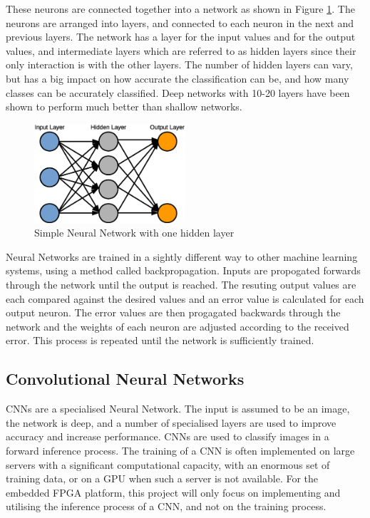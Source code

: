 \documentclass[12pt]{article}
\begin{document}
These neurons are connected together into a network as shown in Figure \ref{fig:ANN}. The neurons are arranged into layers, and connected to each neuron in the next and previous layers. The network has a layer for the input values and for the output values, and intermediate layers which are referred to as hidden layers since their only interaction is with the other layers. The number of hidden layers can vary, but has a big impact on how accurate the classification can be, and how many classes can be accurately classified. Deep networks with 10-20 layers have been shown to perform much better than shallow networks\cite{DeepNetworks}.

\begin{figure}[H]
\centering
\includegraphics[width=0.5\textwidth]{figures/ANN.eps}
\caption{Simple Neural Network with one hidden layer}
\label{fig:ANN}
\end{figure}

Neural Networks are trained in a sightly different way to other machine learning systems, using a method called backpropagation. Inputs are propogated forwards through the network until the output is reached. The resuting output values are each compared against the desired values and an error value is calculated for each output neuron. The error values are then progagated backwards through the network and the weights of each neuron are adjusted according to the received error. This process is repeated until the network is sufficiently trained.

\subsection{Convolutional Neural Networks}
\label{sec:Background-CNN}

CNNs are a specialised Neural Network. The input is assumed to be an image, the network is deep, and a number of specialised layers are used to improve accuracy and increase performance. CNNs are used to classify images in a forward inference process. The training of a CNN is often implemented on large servers with a significant computational capacity, with an enormous set of training data, or on a GPU when such a server is not available. For the embedded FPGA platform, this project will only focus on implementing and utilising the inference process of a CNN, and not on the training process.
\end{document}
